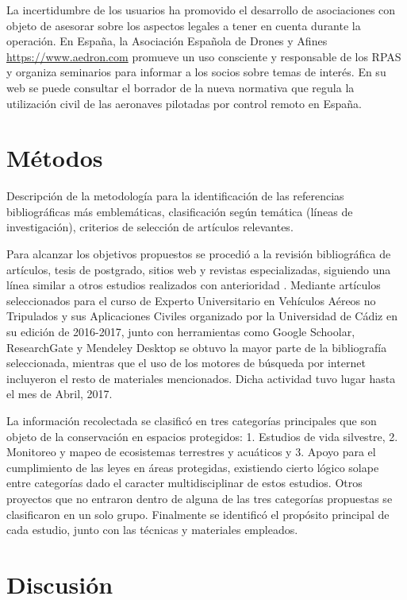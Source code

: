 \documentclass[11pt,]{article}
\begin{document}
La incertidumbre de los usuarios ha promovido el desarrollo de
asociaciones con objeto de asesorar sobre los aspectos legales a tener
en cuenta durante la operación. En España, la Asociación Española de
Drones y Afines \url{https://www.aedron.com} promueve un uso consciente
y responsable de los RPAS y organiza seminarios para informar a los
socios sobre temas de interés. En su web se puede consultar el borrador
de la nueva normativa que regula la utilización civil de las aeronaves
pilotadas por control remoto en España.

\section{Métodos}\label{metodos}

Descripción de la metodología para la identificación de las referencias
bibliográficas más emblemáticas, clasificación según temática (líneas de
investigación), criterios de selección de artículos relevantes.

Para alcanzar los objetivos propuestos se procedió a la revisión
bibliográfica de artículos, tesis de postgrado, sitios web y revistas
especializadas, siguiendo una línea similar a otros estudios realizados
con anterioridad \citet{Linchant2015}. Mediante artículos seleccionados
para el curso de Experto Universitario en Vehículos Aéreos no Tripulados
y sus Aplicaciones Civiles organizado por la Universidad de Cádiz en su
edición de 2016-2017, junto con herramientas como Google Schoolar,
ResearchGate y Mendeley Desktop se obtuvo la mayor parte de la
bibliografía seleccionada, mientras que el uso de los motores de
búsqueda por internet incluyeron el resto de materiales mencionados.
Dicha actividad tuvo lugar hasta el mes de Abril, 2017.

La información recolectada se clasificó en tres categorías principales
que son objeto de la conservación en espacios protegidos: 1. Estudios de
vida silvestre, 2. Monitoreo y mapeo de ecosistemas terrestres y
acuáticos y 3. Apoyo para el cumplimiento de las leyes en áreas
protegidas, existiendo cierto lógico solape entre categorías dado el
caracter multidisciplinar de estos estudios. Otros proyectos que no
entraron dentro de alguna de las tres categorías propuestas se
clasificaron en un solo grupo. Finalmente se identificó el propósito
principal de cada estudio, junto con las técnicas y materiales
empleados.

\section{Discusión}\label{discusion}
\end{document}
